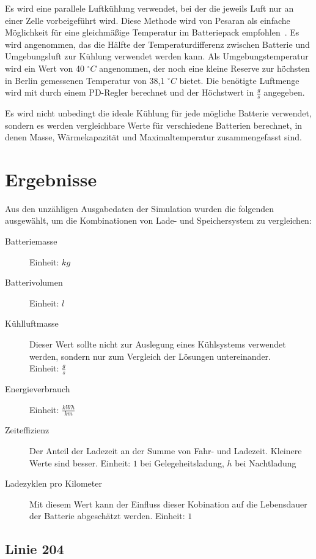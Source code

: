 Es wird eine parallele Luftkühlung verwendet, bei der die jeweils Luft nur an einer Zelle vorbeigeführt wird. Diese Methode wird von Pesaran als einfache Möglichkeit für eine gleichmäßige Temperatur im Batteriepack empfohlen~\cite{pesaran2001battery}. Es wird angenommen, das die Hälfte der Temperaturdifferenz zwischen Batterie und Umgebungsluft zur Kühlung verwendet werden kann. Als Umgebungstemperatur wird ein Wert von 40 $^{\circ}C$ angenommen, der noch eine kleine Reserve zur höchsten in Berlin gemessenen Temperatur von 38,1 $^{\circ}C$ bietet\cite{tempRekord}. Die benötigte Luftmenge wird mit durch einem PD-Regler berechnet und der Höchstwert in $\frac{g}{s}$ angegeben.

Es wird nicht unbedingt die ideale Kühlung für jede mögliche Batterie verwendet, sondern es werden vergleichbare Werte für verschiedene Batterien berechnet, in denen Masse, Wärmekapazität und Maximaltemperatur zusammengefasst sind.

\section{Ergebnisse}

Aus den unzähligen Ausgabedaten der Simulation wurden die folgenden ausgewählt, um die Kombinationen von Lade- und Speichersystem zu vergleichen:
\begin{description}
	\item[Batteriemasse] Einheit: $kg$
	\item[Batterivolumen] Einheit: $l$
	\item[Kühlluftmasse] Dieser Wert sollte nicht zur Auslegung eines Kühlsystems verwendet werden, sondern nur zum Vergleich der Lösungen untereinander.\\
	Einheit: $\frac{g}{s}$
	\item[Energieverbrauch] Einheit: $\frac{kWh}{km}$
	\item[Zeiteffizienz] Der Anteil der Ladezeit an der Summe von Fahr- und Ladezeit. Kleinere Werte sind besser.
	Einheit: $1$ bei Gelegeheitsladung, $h$ bei Nachtladung
	\item[Ladezyklen pro Kilometer] Mit diesem Wert kann der Einfluss dieser Kobination auf die Lebensdauer der Batterie abgeschätzt werden.
	Einheit: $1$
\end{description}

\subsection{Linie 204}
